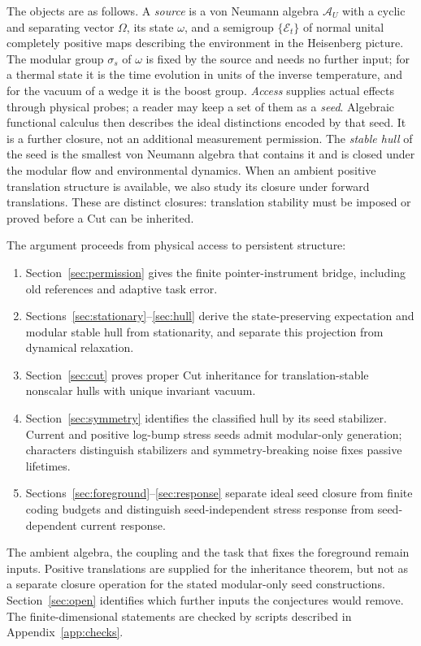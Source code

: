 \documentclass[12pt]{article}
\theoremstyle{definition}
\theoremstyle{remark}
\newcommand{\AU}{\mathcal A_U}
\begin{document}
The objects are as follows. A \emph{source} is a von Neumann algebra \(\AU\) with a
cyclic and separating vector \(\Omega\), its state \(\omega\), and a semigroup
\(\{\mathcal E_t\}\) of normal unital completely positive maps describing the
environment in the Heisenberg picture. The modular group \(\sigma_s\) of \(\omega\) is
fixed by the source and needs no further input; for a thermal state it is the time
evolution in units of the inverse temperature, and for the vacuum of a wedge it is the
boost group. \emph{Access} supplies actual effects through physical probes; a reader may keep a
set of them as a \emph{seed}. Algebraic functional calculus then describes the
ideal distinctions encoded by that seed. It is a further closure, not an
additional measurement permission. The
\emph{stable hull} of the seed is the smallest von Neumann algebra that contains it and
is closed under the modular flow and environmental dynamics. When an ambient positive translation structure is
available, we also study its closure under forward translations. These are distinct
closures: translation stability must be imposed or proved before a Cut can be inherited.

The argument proceeds from physical access to persistent structure:
\begin{enumerate}
\item Section~\ref{sec:permission} gives the finite pointer-instrument
  bridge, including old references and adaptive task error.
\item Sections~\ref{sec:stationary}--\ref{sec:hull} derive the
  state-preserving expectation and modular stable hull from
  stationarity, and separate this projection from dynamical relaxation.
\item Section~\ref{sec:cut} proves proper Cut inheritance for
  translation-stable nonscalar hulls with unique invariant vacuum.
\item Section~\ref{sec:symmetry} identifies the classified hull by its
  seed stabilizer. Current and positive log-bump stress seeds admit
  modular-only generation; characters distinguish stabilizers and
  symmetry-breaking noise fixes passive lifetimes.
\item Sections~\ref{sec:foreground}--\ref{sec:response} separate
  ideal seed closure from finite coding budgets and distinguish
  seed-independent stress response from seed-dependent current response.
\end{enumerate}

The ambient algebra, the coupling and the task that fixes the foreground remain
inputs. Positive translations are supplied for the inheritance theorem, but not
as a separate closure operation for the stated modular-only seed constructions.
Section~\ref{sec:open} identifies which further inputs the conjectures would remove. The finite-dimensional statements are
checked by scripts described in Appendix~\ref{app:checks}.
\end{document}
